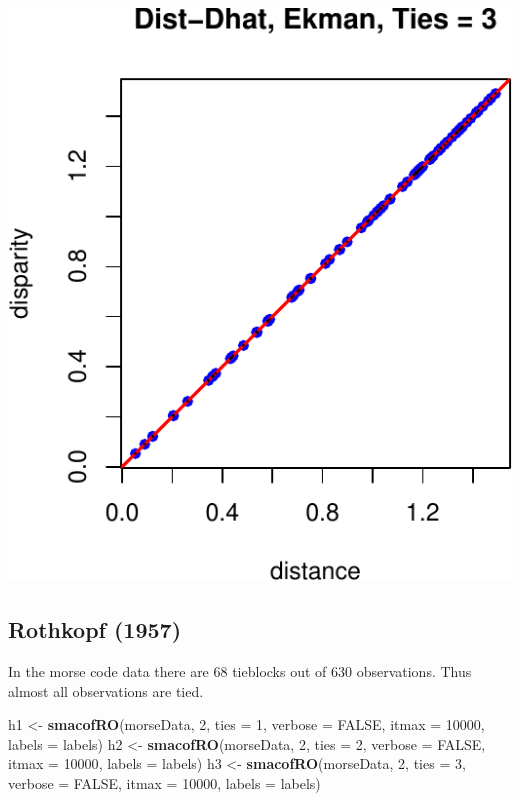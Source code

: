 \documentclass[
  12pt,
]{article}
\newenvironment{Shaded}{\begin{snugshade}}{\end{snugshade}}
\newcommand{\AttributeTok}[1]{\textcolor[rgb]{0.13,0.29,0.53}{#1}}
\newcommand{\ConstantTok}[1]{\textcolor[rgb]{0.56,0.35,0.01}{#1}}
\newcommand{\DecValTok}[1]{\textcolor[rgb]{0.00,0.00,0.81}{#1}}
\newcommand{\FunctionTok}[1]{\textcolor[rgb]{0.13,0.29,0.53}{\textbf{#1}}}
\newcommand{\NormalTok}[1]{#1}
\newcommand{\OtherTok}[1]{\textcolor[rgb]{0.56,0.35,0.01}{#1}}
\begin{document}
\begin{center}\includegraphics{smacofRO_files/figure-latex/plotekmandd-3} \end{center}

\subsection{Rothkopf (1957)}\label{rothkopf_57}

In the morse code data there are 68 tieblocks out of
630 observations. Thus almost all observations are tied.

\begin{Shaded}
\begin{Highlighting}[]
\NormalTok{h1 }\OtherTok{\textless{}{-}} \FunctionTok{smacofRO}\NormalTok{(morseData, }\DecValTok{2}\NormalTok{, }\AttributeTok{ties =} \DecValTok{1}\NormalTok{, }\AttributeTok{verbose =} \ConstantTok{FALSE}\NormalTok{, }\AttributeTok{itmax =} \DecValTok{10000}\NormalTok{, }\AttributeTok{labels =}\NormalTok{ labels)}
\NormalTok{h2 }\OtherTok{\textless{}{-}} \FunctionTok{smacofRO}\NormalTok{(morseData, }\DecValTok{2}\NormalTok{, }\AttributeTok{ties =} \DecValTok{2}\NormalTok{, }\AttributeTok{verbose =} \ConstantTok{FALSE}\NormalTok{, }\AttributeTok{itmax =} \DecValTok{10000}\NormalTok{, }\AttributeTok{labels =}\NormalTok{ labels)}
\NormalTok{h3 }\OtherTok{\textless{}{-}} \FunctionTok{smacofRO}\NormalTok{(morseData, }\DecValTok{2}\NormalTok{, }\AttributeTok{ties =} \DecValTok{3}\NormalTok{, }\AttributeTok{verbose =} \ConstantTok{FALSE}\NormalTok{, }\AttributeTok{itmax =} \DecValTok{10000}\NormalTok{, }\AttributeTok{labels =}\NormalTok{ labels)}
\end{Highlighting}
\end{Shaded}
\end{document}
